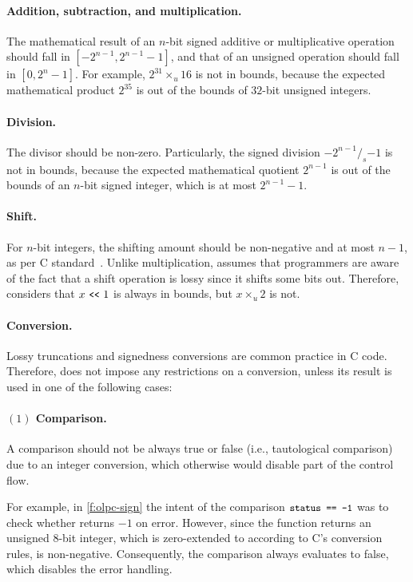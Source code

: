 \paragraph{Addition, subtraction, and multiplication.}
The mathematical result of an $n$-bit signed additive or multiplicative
operation should fall in $[-2^{n-1}, 2^{n-1}-1]$,
and that of an unsigned operation should fall in
$[0, 2^{n}-1]$.
For example,
$2^{31}\times_u 16$ is not in bounds,
because the expected mathematical product $2^{35}$ is out of the bounds
of $32$-bit unsigned integers.

\paragraph{Division.}
The divisor should be non-zero.  Particularly, the signed division
$-2^{n-1} /_s {-1}$ is not in bounds, because the expected mathematical
quotient $2^{n-1}$ is out of the bounds of an $n$-bit signed integer,
which is at most $2^{n-1}-1$.

\paragraph{Shift.}
For $n$-bit integers, the shifting amount should be non-negative
and at most $n-1$, as per C standard~\cite[\subsectionautorefname~6.5.7]{c11}.
%
Unlike multiplication, \sys assumes that programmers are aware of
the fact that a shift operation is lossy since it shifts some bits
out.  Therefore, \sys considers that $x \shl 1$ is always in bounds, but
$x \times_u 2$ is not.

\paragraph{Conversion.}
Lossy truncations and signedness conversions are common practice in
C code.  Therefore,
\sys does not impose any restrictions on a conversion,
unless its result is used in one of the following cases:

\paragraph{$(1)$ Comparison.}
A comparison should not be always true or false (i.e., tautological
comparison) due to an integer conversion, which otherwise would
disable part of the control flow.

For example, in \autoref{f:olpc-sign} the intent of the comparison
$\cc{status == -1}$ was to check whether  returns
${-1}$ on error.  However, since the function returns an unsigned 8-bit
integer, which is zero-extended to  according to C's
conversion rules,  is non-negative.  Consequently,
the comparison always evaluates to false, which disables the error
handling.

